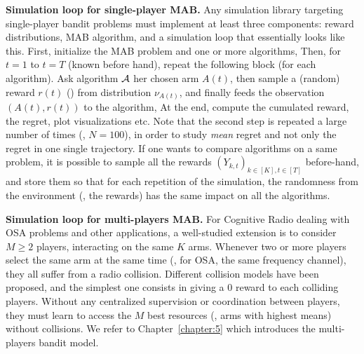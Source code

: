 \textbf{Simulation loop for single-player MAB.}
%
Any simulation library targeting single-player bandit problems must implement at least three components:
reward distributions, MAB algorithm, and a simulation loop that essentially looks like this.
    First, initialize the MAB problem and one or more algorithms,
    Then, for $t=1$ to $t=T$ (known before hand), repeat the following block (for each algorithm). Ask algorithm $\mathcal{A}$ her chosen arm $A(t)$, then sample a (random) reward $r(t)$ (\iid) from distribution $\nu_{A(t)}$, and finally feeds the observation $(A(t), r(t))$ to the algorithm,
    At the end, compute the cumulated reward, the regret, plot visualizations etc.
%
Note that the second step is repeated a large number of times (\eg, $N=100$), in order to study \emph{mean} regret and not only the regret in one single trajectory.
If one wants to compare algorithms on a same problem, it is possible to sample all the rewards $(Y_{k,t})_{k\in[K], t\in[T]}$ before-hand, and store them so that for each repetition of the simulation, the randomness from the environment (\ie, the rewards) has the same impact on all the algorithms.


\textbf{Simulation loop for multi-players MAB.}
%
For Cognitive Radio dealing with OSA problems and other applications, a well-studied extension is to consider $M\geq2$ players, interacting on the same $K$ arms.
Whenever two or more players select the same arm at the same time (\eg, for OSA, the same frequency channel), they all suffer from a radio collision.
%
Different collision models have been proposed, and the simplest one consists in giving a $0$ reward to each colliding players.
Without any centralized supervision or coordination between players, they must learn to access the $M$ best resources (\ie, arms with highest means) without collisions.
We refer to Chapter~\ref{chapter:5} which introduces the multi-players bandit model.

